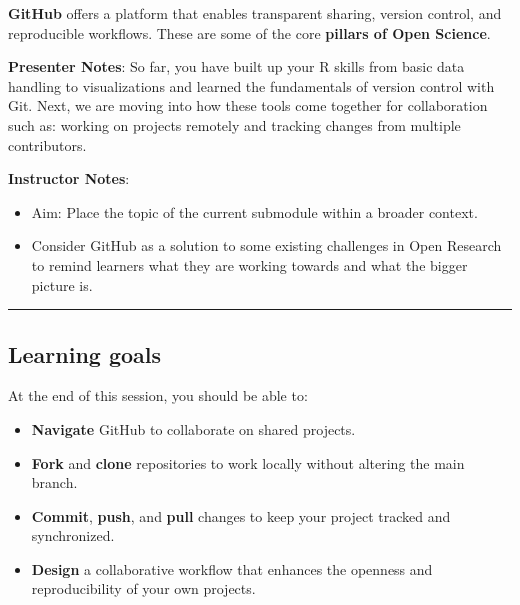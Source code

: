 \documentclass[
  letterpaper,
  DIV=11,
  numbers=noendperiod]{scrartcl}
\providecommand{\tightlist}{%
  \setlength{\itemsep}{0pt}\setlength{\parskip}{0pt}}
\begin{document}
\begin{tcolorbox}[enhanced jigsaw, colbacktitle=quarto-callout-note-color!10!white, opacityback=0, leftrule=.75mm, colback=white, opacitybacktitle=0.6, colframe=quarto-callout-note-color-frame, title=\textcolor{quarto-callout-note-color}{\faInfo}\hspace{0.5em}{GitHub and Open Science}, left=2mm, titlerule=0mm, toptitle=1mm, breakable, bottomtitle=1mm, arc=.35mm, rightrule=.15mm, bottomrule=.15mm, toprule=.15mm, coltitle=black]

\textbf{GitHub} offers a platform that enables transparent sharing,
version control, and reproducible workflows. These are some of the core
\textbf{pillars of Open Science}.

\end{tcolorbox}

\textbf{Presenter Notes}: So far, you have built up your R skills from
basic data handling to visualizations and learned the fundamentals of
version control with Git. Next, we are moving into how these tools come
together for collaboration such as: working on projects remotely and
tracking changes from multiple contributors.

\textbf{Instructor Notes}:

\begin{itemize}
\item
  Aim: Place the topic of the current submodule within a broader
  context.
\item
  Consider GitHub as a solution to some existing challenges in Open
  Research to remind learners what they are working towards and what the
  bigger picture is.
\end{itemize}

\begin{center}\rule{0.5\linewidth}{0.5pt}\end{center}

\subsection{Learning goals}\label{learning-goals}

At the end of this session, you should be able to:

\begin{itemize}
\tightlist
\item
  \textbf{Navigate} GitHub to collaborate on shared projects.
\item
  \textbf{Fork} and \textbf{clone} repositories to work locally without
  altering the main branch.
\item
  \textbf{Commit}, \textbf{push}, and \textbf{pull} changes to keep your
  project tracked and synchronized.
\item
  \textbf{Design} a collaborative workflow that enhances the openness
  and reproducibility of your own projects.
\end{itemize}
\end{document}
